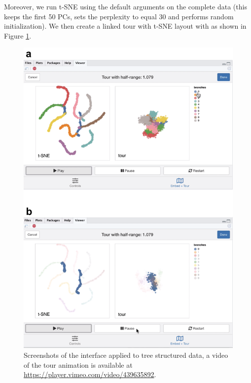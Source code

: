 \documentclass[article,notitle]{jdssv}
\begin{document}
Moreover, we run t-SNE using the default arguments on the complete data (this
keeps the first 50 PCs, sets the perplexity to equal 30 and performs random
initialization). We then create a linked
tour with t-SNE layout with  as shown in Figure \ref{fig:trees-01}.



\begin{figure}

{\centering \includegraphics[width=\textwidth,height=0.75\textheight]{./img/liminal-screenshot-trees-01} 

}

\caption{Screenshots of the  interface applied to tree structured data, a video of the tour animation is available at \url{https://player.vimeo.com/video/439635892}.}\label{fig:trees-01}
\end{figure}
\end{document}
